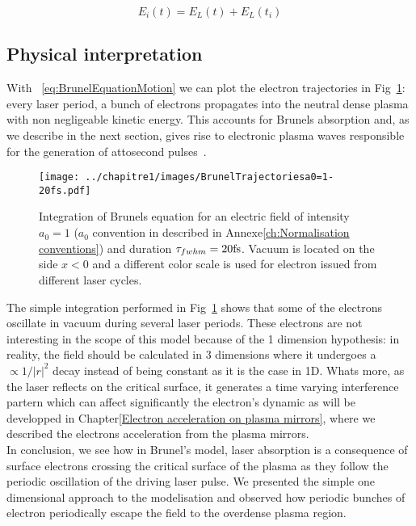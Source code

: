 \begin{equation}
E_i(t) = E_L(t) + E_L(t_i)
\end{equation}

\subsection{Physical interpretation}

With ~\ref{eq:BrunelEquationMotion} we can plot the electron trajectories in Fig~\ref{fig:BrunelTrajectories}: every laser period, a bunch of electrons propagates into the neutral dense plasma with non negligeable kinetic energy. This accounts for Brunels absorption and, as we describe in the next section, gives rise to electronic plasma waves responsible for the generation of attosecond pulses~\cite{thaury2010high}.

\begin{figure}[H]
\centering
\texttt{[image: ../chapitre1/images/BrunelTrajectoriesa0=1-20fs.pdf]}\\
\caption{\label{fig:BrunelTrajectories}Integration of Brunels equation for an electric field of intensity $a_0=1$ ($a_0$ convention in described in Annexe\ref{ch:Normalisation conventions}) and duration $\tau_{fwhm} = 20 \rm{fs}$. Vacuum is located on the side $x<0$ and a different color scale is used for electron issued from different laser cycles.}
\end{figure}

\noindent The simple integration performed in Fig~\ref{fig:BrunelTrajectories} shows that some of the electrons oscillate in vacuum during several laser periods. These electrons are not interesting in the scope of this model because of the 1 dimension hypothesis: in reality, the field should be calculated in 3 dimensions 
where it undergoes a $\propto 1/|r|^2$ decay instead of being constant as it is the case in 1D. Whats more, as the laser reflects on the critical surface, it generates a time varying interference partern which can affect significantly the electron's dynamic as will be developped in Chapter\ref{Electron acceleration on plasma mirrors}, where we described the electrons acceleration from the plasma mirrors.\\

\noindent In conclusion, we see how in Brunel's model, laser absorption is a consequence of surface electrons crossing the critical surface of the plasma as they follow the periodic oscillation of the driving laser pulse. We presented the simple one dimensional approach to the modelisation and observed how periodic bunches of electron periodically escape the field to the overdense plasma region. \\

